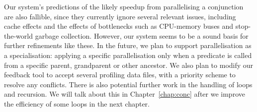 Our system's predictions of the likely speedup from parallelising a conjunction
are also fallible, since they currently ignore several relevant issues,
including cache effects
and the effects of bottlenecks
such as CPU-memory buses and stop-the-world garbage collection.
However, our system seems to be a sound basis for further refinements like
these.
In the future, we plan to support parallelisation as a specialisation:
applying a specific parallelisation only when a predicate is called
from a specific parent, grandparent or other ancestor.
We also plan to modify our feedback tool
to accept several profiling data files,
with a priority scheme to resolve any conflicts.
There is also potential further work in the handling of loops and recursion.
We will talk about this in Chapter~\ref{chap:conc}
after we improve the efficiency of some loops in the next chapter.


